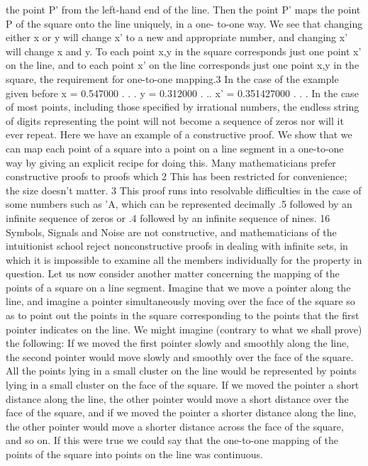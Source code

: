 the point P' from the left-hand end of the line. Then the point P'
maps the point P of the square onto the line uniquely, in a one-
to-one way. We see that changing either x or y will change x' to a
new and appropriate number, and changing x’ will change x and
y. To each point x,y in the square corresponds just one point x'
on the line, and to each point x’ on the line corresponds just one
point x,y in the square, the requirement for one-to-one mapping.3
In the case of the example given before
x = 0.547000 . . .
y = 0.312000 . ..
x' = 0.351427000 . . .
In the case of most points, including those specified by irrational
numbers, the endless string of digits representing the point will not
become a sequence of zeros nor will it ever repeat.
Here we have an example of a constructive proof. We show that
we can map each point of a square into a point on a line segment
in a one-to-one way by giving an explicit recipe for doing this.
Many mathematicians prefer constructive proofs to proofs which
2 This has been restricted for convenience; the size doesn’t matter.
3 This proof runs into resolvable difficulties in the case of some numbers such as
'A, which can be represented decimally .5 followed by an infinite sequence of zeros
or .4 followed by an infinite sequence of nines.
16
Symbols, Signals and Noise
are not constructive, and mathematicians of the intuitionist school
reject nonconstructive proofs in dealing with infinite sets, in which
it is impossible to examine all the members individually for the
property in question.
Let us now consider another matter concerning the mapping of
the points of a square on a line segment. Imagine that we move
a pointer along the line, and imagine a pointer simultaneously
moving over the face of the square so as to point out the points
in the square corresponding to the points that the first pointer
indicates on the line. We might imagine (contrary to what we shall
prove) the following: If we moved the first pointer slowly and
smoothly along the line, the second pointer would move slowly and
smoothly over the face of the square. All the points lying in a small
cluster on the line would be represented by points lying in a small
cluster on the face of the square. If we moved the pointer a short
distance along the line, the other pointer would move a short
distance over the face of the square, and if we moved the pointer
a shorter distance along the line, the other pointer would move a
shorter distance across the face of the square, and so on. If this
were true we could say that the one-to-one mapping of the points
of the square into points on the line was continuous.
